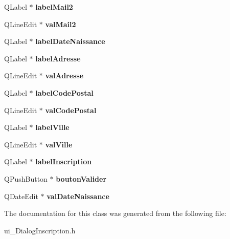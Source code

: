\begin{DoxyCompactItemize}
\item 
Q\-Label $\ast$ {\bfseries label\-Mail2}\label{class_ui___dialog_inscription_a83b16295a5660be94337009689309625}

\item 
Q\-Line\-Edit $\ast$ {\bfseries val\-Mail2}\label{class_ui___dialog_inscription_a2117b03c051572a35de79494744e2161}

\item 
Q\-Label $\ast$ {\bfseries label\-Date\-Naissance}\label{class_ui___dialog_inscription_a41ff3fa5247196c1a310781633672ea7}

\item 
Q\-Label $\ast$ {\bfseries label\-Adresse}\label{class_ui___dialog_inscription_ad5bb5ca7f98ec799abd4a83c56fff220}

\item 
Q\-Line\-Edit $\ast$ {\bfseries val\-Adresse}\label{class_ui___dialog_inscription_ac5ffebadc65a04992a0c00ffcdd8378c}

\item 
Q\-Label $\ast$ {\bfseries label\-Code\-Postal}\label{class_ui___dialog_inscription_a8f0a88b8bbc71f40331af3dc6672b605}

\item 
Q\-Line\-Edit $\ast$ {\bfseries val\-Code\-Postal}\label{class_ui___dialog_inscription_a3f257084e12a690ae6424651f2ca0906}

\item 
Q\-Label $\ast$ {\bfseries label\-Ville}\label{class_ui___dialog_inscription_a21cf68832bf725cc2cb702a5d4338173}

\item 
Q\-Line\-Edit $\ast$ {\bfseries val\-Ville}\label{class_ui___dialog_inscription_a97278f7c4479f5eebee4d44527362cd5}

\item 
Q\-Label $\ast$ {\bfseries label\-Inscription}\label{class_ui___dialog_inscription_a452e0b0adff0141927a345e5c92ca4b1}

\item 
Q\-Push\-Button $\ast$ {\bfseries bouton\-Valider}\label{class_ui___dialog_inscription_abcf7cc88e00f9004f42b1bea602d584a}

\item 
Q\-Date\-Edit $\ast$ {\bfseries val\-Date\-Naissance}\label{class_ui___dialog_inscription_a275d934e6e7ad6848d05f4f92fb28289}

\end{DoxyCompactItemize}


The documentation for this class was generated from the following file\-:\begin{DoxyCompactItemize}
\item 
ui\-\_\-\-Dialog\-Inscription.\-h\end{DoxyCompactItemize}

